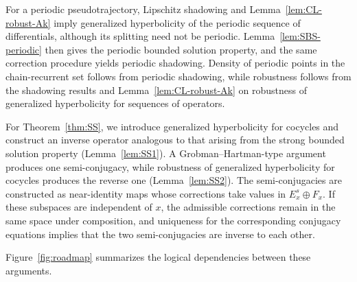 \documentclass[12pt]{article}
\theoremstyle{definition}
\begin{document}
For a periodic pseudotrajectory, Lipschitz shadowing and Lemma~\ref{lem:CL-robust-Ak} imply generalized hyperbolicity of the periodic sequence of differentials, although its splitting need not be periodic.
Lemma~\ref{lem:SBS-periodic} then gives the periodic bounded solution property, and the same correction procedure yields periodic shadowing. Density of periodic points in the chain-recurrent set follows from periodic shadowing, while robustness follows from the shadowing results and Lemma~\ref{lem:CL-robust-Ak} on robustness of generalized hyperbolicity for sequences of operators.


For Theorem~\ref{thm:SS}, we introduce generalized hyperbolicity for cocycles and construct an inverse operator analogous to that arising from the strong bounded solution property (Lemma~\ref{lem:SS1}).
A Grobman--Hartman-type argument produces one semi-conjugacy, while robustness of generalized hyperbolicity for cocycles produces the reverse one (Lemma~\ref{lem:SS2}).
The semi-conjugacies are constructed as near-identity maps whose corrections take values in $E_x^s\oplus F_x$. If these subspaces are independent of $x$, the admissible corrections remain in the same space under composition, and uniqueness for the corresponding conjugacy equations implies that the two semi-conjugacies are inverse to each other.

Figure~\ref{fig:roadmap} summarizes the logical dependencies between these arguments.
\end{document}
